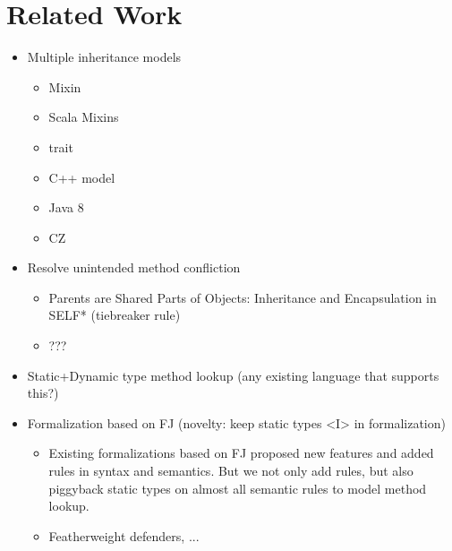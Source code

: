\section{Related Work}

\begin{itemize}
	\item Multiple inheritance models
		\begin{itemize}
			\item Mixin
			\item Scala Mixins
			\item trait
			\item C++ model
			\item Java 8
			\item CZ
		\end{itemize}
	\item Resolve unintended method confliction
		\begin{itemize}
			\item Parents are Shared Parts of Objects: Inheritance and Encapsulation in SELF* (tiebreaker rule)
			\item ???
		\end{itemize}
	\item Static+Dynamic type method lookup (any existing language that supports this?)
	\item Formalization based on FJ (novelty: keep static types <I> in formalization)
		\begin{itemize}
			\item Existing formalizations based on FJ proposed new features and added rules in syntax and semantics. But we not only add rules, but also piggyback static types on almost all semantic rules to model method lookup. 
			\item Featherweight defenders, ...
		\end{itemize}
\end{itemize}